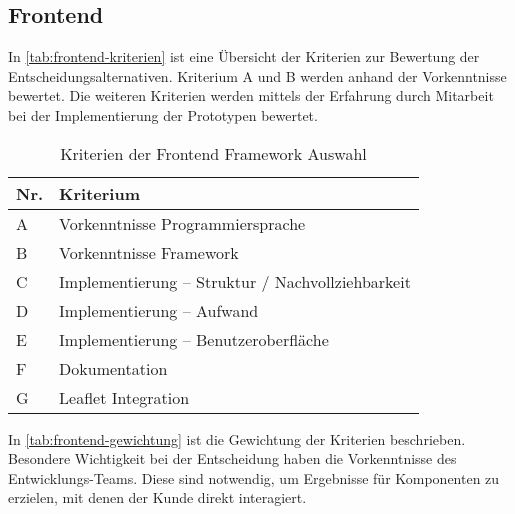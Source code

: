 \subsection{Frontend}
In \autoref{tab:frontend-kriterien} ist eine Übersicht der Kriterien zur Bewertung der Entscheidungsalternativen.
Kriterium A und B werden anhand der Vorkenntnisse bewertet.
Die weiteren Kriterien werden mittels der Erfahrung durch Mitarbeit bei der Implementierung der Prototypen bewertet.

\begin{table}[h]
	\caption{Kriterien der Frontend Framework Auswahl}
	\begin{center}
		\begin{tabular}{ll}
			\toprule
			Nr. & Kriterium                                        \\ \midrule
			A   & Vorkenntnisse Programmiersprache                 \\
			B   & Vorkenntnisse Framework                          \\
			C   & Implementierung – Struktur / Nachvollziehbarkeit \\
			D   & Implementierung – Aufwand                        \\
			E   & Implementierung – Benutzeroberfläche             \\
			F   & Dokumentation                                    \\
			G   & Leaflet Integration                              \\ \bottomrule
		\end{tabular}
	\end{center}
	\label{tab:frontend-kriterien}
\end{table}

In \autoref{tab:frontend-gewichtung} ist die Gewichtung der Kriterien beschrieben.
Besondere Wichtigkeit bei der Entscheidung haben die Vorkenntnisse des Entwicklungs-Teams.
Diese sind notwendig, um Ergebnisse für Komponenten zu erzielen, mit denen der Kunde direkt interagiert.

